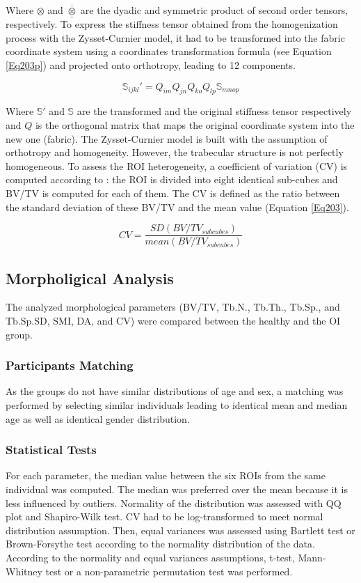 \documentclass[a4paper,fleqn]{DC_ArtStyle}
\begin{document}
Where $\otimes$ and $\overline{\underline{\otimes}}$ are the dyadic and symmetric product of second order tensors, respectively. To express the stiffness tensor obtained from the homogenization process with the Zysset-Curnier model, it had to be transformed into the fabric coordinate system using a coordinates transformation formula (see Equation \ref{Eq203p}) and projected onto orthotropy, leading to 12 components. 

\begin{equation}
	\mathbb{S}_{ijkl}' = Q_{im}Q_{jn}Q_{ko}Q_{lp} \mathbb{S}_{mnop}
	\label{Eq203p}
\end{equation}

Where $\mathbb{S}'$ and $\mathbb{S}$ are the transformed and the original stiffness tensor respectively and $Q$ is the orthogonal matrix that maps the original coordinate system into the new one (fabric). The Zysset-Curnier model is built with the assumption of orthotropy and homogeneity. However, the trabecular structure is not perfectly homogeneous. To assess the ROI heterogeneity, a coefficient of variation (CV) is computed according to \citeauthor{Panyasantisuk2015}\cite{Panyasantisuk2015}: the ROI is divided into eight identical sub-cubes and BV/TV is computed for each of them. The CV is defined as the ratio between the standard deviation of these BV/TV and the mean value (Equation \ref{Eq203}).

\begin{equation}
	CV = \frac{SD(BV/TV_{subcubes})}{mean(BV/TV_{subcubes})}
	\label{Eq203}
\end{equation}

\subsection{Morpholigical Analysis}
The analyzed morphological parameters (BV/TV, Tb.N., Tb.Th., Tb.Sp., and Tb.Sp.SD, SMI, DA, and CV) were compared between the healthy and the OI group.

\subsubsection{Participants Matching}
As the groups do not have similar distributions of age and sex, a matching was performed by selecting similar individuals leading to identical mean and median age as well as identical gender distribution.

\subsubsection{Statistical Tests}
For each parameter, the median value between the six ROIs from the same individual was computed. The median was preferred over the mean because it is less influenced by outliers. Normality of the distribution was assessed with QQ plot and Shapiro-Wilk test. CV had to be log-transformed to meet normal distribution assumption. Then, equal variances was assessed using Bartlett test or Brown-Forsythe test according to the normality distribution of the data. According to the normality and equal variances assumptions, t-test, Mann-Whitney test or a non-parametric permutation test was performed. 
\end{document}
